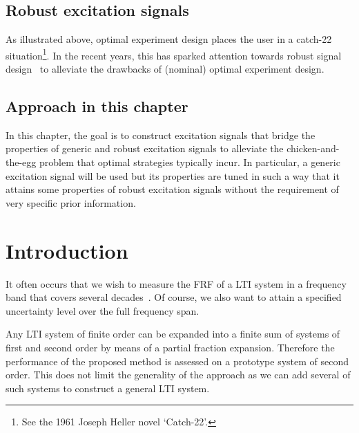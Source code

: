 \subsection{Robust excitation signals}
\label{sec:excitation:intro:robust}
As illustrated above, optimal experiment design places the user in a catch-22 situation\footnote{See the 1961 Joseph Heller novel `Catch-22'.}.
In the recent years, this has sparked attention towards robust signal design~\citep{Rojas2007} to alleviate the drawbacks of (nominal) optimal experiment design.

\subsection{Approach in this chapter}
\label{sec:excitation:intro:approach}
In this chapter, the goal is to construct excitation signals that bridge the properties of generic and robust excitation signals to alleviate the chicken-and-the-egg problem that optimal strategies typically incur.
In particular, a generic excitation signal will be used but its properties are tuned in such a way that it attains some properties of robust excitation signals without the requirement of very specific prior information. 




\section{Introduction}
  It often occurs that we wish to measure the \gls{FRF} of a \gls{LTI} system in a frequency band that covers several decades~\citep{Bragos2001,Sanchez2011,Niedostatkiewicz2009,VanGheem2004}.
  Of course, we also want to attain a specified uncertainty level over the full frequency span.

  Any \gls{LTI} system of finite order can be expanded into a  finite sum of systems of first and second order by means of a partial fraction expansion\citep{Oppenheim1983}.
  Therefore the performance of the proposed method is assessed on a prototype system of second order.
  This does not limit the generality of the approach as we can add several of such systems to construct a general \gls{LTI} system.
  
